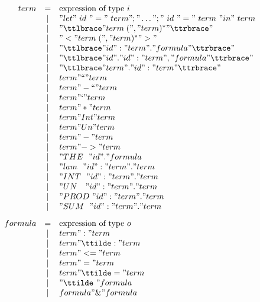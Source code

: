 \begin{figure} 
\dquotes
\[\begin{array}{rcl}
    term & = & \hbox{expression of type~$i$} \\
         & | & "let"~id~"="~term";"\dots";"~id~"="~term~"in"~term \\
         & | & "{\ttlbrace} " term\; ("," term)^* " {\ttrbrace}" \\
         & | & "< "  term\; ("," term)^* " >"  \\
         & | & "{\ttlbrace} " id ":" term " . " formula " {\ttrbrace}" \\
         & | & "{\ttlbrace} " id " . " id ":" term ", " formula " {\ttrbrace}" \\
         & | & "{\ttlbrace} " term " . " id ":" term " {\ttrbrace}" \\
         & | & term " `` " term \\
         & | & term " -`` " term \\
         & | & term " ` " term \\
         & | & term " * " term \\
         & | & term " Int " term \\
         & | & term " Un " term \\
         & | & term " - " term \\
         & | & term " -> " term \\
         & | & "THE~~"  id  " . " formula\\
         & | & "lam~~"  id ":" term " . " term \\
         & | & "INT~~"  id ":" term " . " term \\
         & | & "UN~~~"  id ":" term " . " term \\
         & | & "PROD~"  id ":" term " . " term \\
         & | & "SUM~~"  id ":" term " . " term \\[2ex]
 formula & = & \hbox{expression of type~$o$} \\
         & | & term " : " term \\
         & | & term " \ttilde: " term \\
         & | & term " <= " term \\
         & | & term " = " term \\
         & | & term " \ttilde= " term \\
         & | & "\ttilde\ " formula \\
         & | & formula " \& " formula \\

\end{array}\]
\end{figure}
